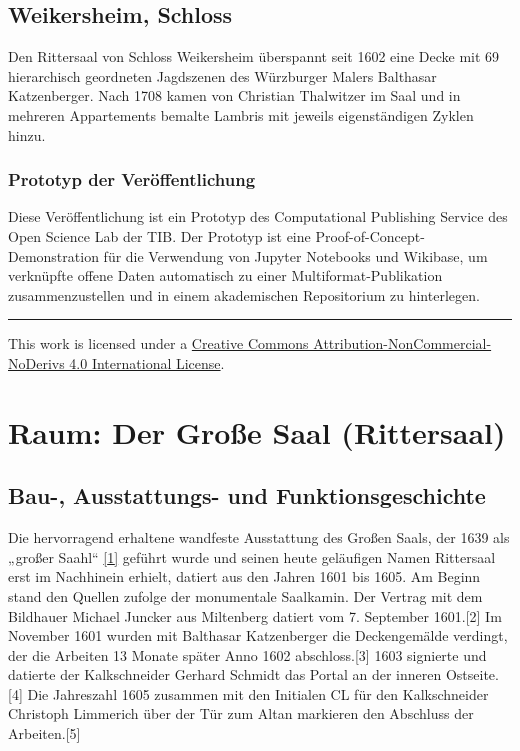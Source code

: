 \documentclass[
  a4paper,
  openany]{book}
\makeatletter
\newcommand*\pandocbounded[1]{%
  \sbox\pandoc@box{#1}%
  \Gscale@div\@tempa{\textheight}{\dimexpr\ht\pandoc@box+\dp\pandoc@box\relax}%
  \Gscale@div\@tempb{\linewidth}{\wd\pandoc@box}%
  \ifdim\@tempb\p@<\@tempa\p@\let\@tempa\@tempb\fi%
  \ifdim\@tempa\p@<\p@\scalebox{\@tempa}{\usebox\pandoc@box}%
  \else\usebox{\pandoc@box}%
  \fi%
}
\makeatother
\begin{document}
\section{Weikersheim, Schloss}\label{weikersheim-schloss}

Den Rittersaal von Schloss Weikersheim überspannt seit 1602 eine Decke
mit 69 hierarchisch geordneten Jagdszenen des Würzburger Malers
Balthasar Katzenberger. Nach 1708 kamen von Christian Thalwitzer im Saal
und in mehreren Appartements bemalte Lambris mit jeweils eigenständigen
Zyklen hinzu.

\subsection{Prototyp der
Veröffentlichung}\label{prototyp-der-veruxf6ffentlichung}

Diese Veröffentlichung ist ein Prototyp des Computational Publishing
Service des Open Science Lab der TIB. Der Prototyp ist eine
Proof-of-Concept-Demonstration für die Verwendung von Jupyter Notebooks
und Wikibase, um verknüpfte offene Daten automatisch zu einer
Multiformat-Publikation zusammenzustellen und in einem akademischen
Repositorium zu hinterlegen.

\begin{center}\rule{0.5\linewidth}{0.5pt}\end{center}

\pandocbounded{\texttt{[image: index\_files/mediabag/88x31.png]}}

This work is licensed under a
\href{https://creativecommons.org/licenses/by-nc-nd/4.0/}{Creative
Commons Attribution-NonCommercial-NoDerivs 4.0 International License}.


\chapter{Raum: Der Große Saal
(Rittersaal)}\label{raum-der-grouxdfe-saal-rittersaal}

\section{Bau-, Ausstattungs- und
Funktionsgeschichte}\label{bau--ausstattungs--und-funktionsgeschichte}

Die hervorragend erhaltene wandfeste Ausstattung des Großen Saals, der
1639 als „großer Saahl``
\href{https://www.deckenmalerei.eu/edit/451519cf-21f1-45da-b455-d7e7268ed471\#_ftn1}{{[}1{]}}
geführt wurde und seinen heute geläufigen Namen Rittersaal erst im
Nachhinein erhielt, datiert aus den Jahren 1601 bis 1605. Am Beginn
stand den Quellen zufolge der monumentale Saalkamin. Der Vertrag mit dem
Bildhauer Michael Juncker aus Miltenberg datiert vom 7. September
1601.{[}2{]} Im November 1601 wurden mit Balthasar Katzenberger die
Deckengemälde verdingt, der die Arbeiten 13 Monate später Anno 1602
abschloss.{[}3{]} 1603 signierte und datierte der Kalkschneider Gerhard
Schmidt das Portal an der inneren Ostseite.{[}4{]} Die Jahreszahl 1605
zusammen mit den Initialen CL für den Kalkschneider Christoph Limmerich
über der Tür zum Altan markieren den Abschluss der Arbeiten.{[}5{]}
\end{document}

